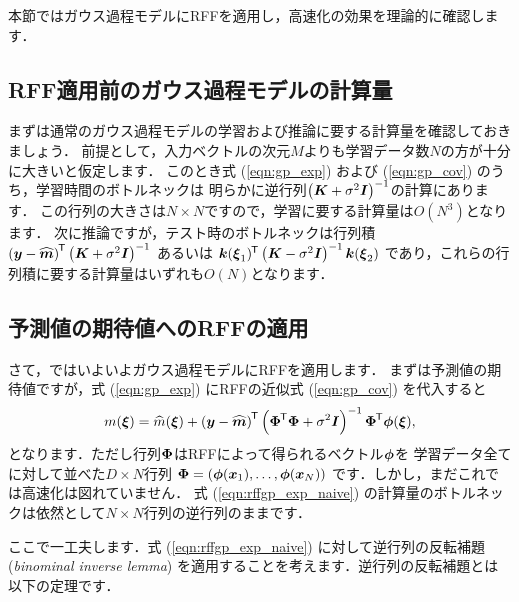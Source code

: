%

本節ではガウス過程モデルにRFFを適用し，高速化の効果を理論的に確認します．

\subsection{RFF適用前のガウス過程モデルの計算量}

まずは通常のガウス過程モデルの学習および推論に要する計算量を確認しておきましょう．
前提として，入力ベクトルの次元$M$よりも学習データ数$N$の方が十分に大きいと仮定します．
このとき式 (\ref{eqn:gp_exp}) および (\ref{eqn:gp_cov}) のうち，学習時間のボトルネックは
明らかに逆行列$\left( \boldsymbol{K} + \sigma^2 \boldsymbol{I} \right)^{-1}$の計算にあります．
この行列の大きさは$N \times N$ですので，学習に要する計算量は$O(N^3)$となります．
次に推論ですが，テスト時のボトルネックは行列積
$\left( \boldsymbol{y} - \widehat{\boldsymbol{m}} \right)^{\mkern-1.5mu\mathsf{T}} \left( \boldsymbol{K} + \sigma^2 \boldsymbol{I} \right)^{-1}$
あるいは
$\boldsymbol{k}(\boldsymbol{\xi}_1)^{\mkern-1.5mu\mathsf{T}} \left( \boldsymbol{K} - \sigma^2 \boldsymbol{I} \right)^{-1} \boldsymbol{k}(\boldsymbol{\xi}_2)$
であり，これらの行列積に要する計算量はいずれも$O(N)$となります．

\subsection{予測値の期待値へのRFFの適用}

さて，ではいよいよガウス過程モデルにRFFを適用します．
まずは予測値の期待値ですが，式 (\ref{eqn:gp_exp}) にRFFの近似式 (\ref{eqn:gp_cov}) を代入すると
\begin{equation}
    m(\boldsymbol{\xi}) = \widehat{m}(\boldsymbol{\xi}) + \left( \boldsymbol{y} - \widehat{\boldsymbol{m}} \right)^{\mkern-1.5mu\mathsf{T}}
    \left( \boldsymbol{\Phi}^{\mkern-1.5mu\mathsf{T}} \boldsymbol{\Phi} + \sigma^2 \boldsymbol{I} \right)^{-1} \boldsymbol{\Phi}^{\mkern-1.5mu\mathsf{T}} \boldsymbol{\phi}(\boldsymbol{\xi}),
    \label{eqn:rffgp_exp_naive}
\end{equation}
となります．ただし行列$\boldsymbol{\Phi}$はRFFによって得られるベクトル$\boldsymbol{\phi}$を
学習データ全てに対して並べた$D \times N$行列
$\boldsymbol{\Phi} = (\boldsymbol{\phi}(\boldsymbol{x}_1), \ldots, \boldsymbol{\phi}(\boldsymbol{x}_N))$
です．しかし，まだこれでは高速化は図れていません．
式 (\ref{eqn:rffgp_exp_naive}) の計算量のボトルネックは依然として$N \times N$行列の逆行列のままです．

ここで一工夫します．式 (\ref{eqn:rffgp_exp_naive}) に対して逆行列の反転補題 (\textit{binominal inverse lemma}) 
を適用することを考えます．逆行列の反転補題とは以下の定理です．

